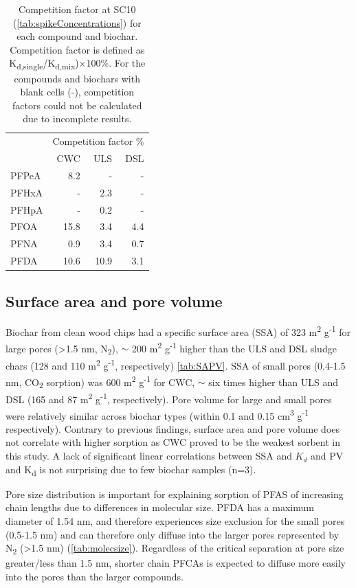 \begin{table}
\centering
\caption{Competition factor at SC10 (\cref{tab:spikeConcentrations}) for each compound and biochar. Competition factor is defined as K\textsubscript{d,single}/K\textsubscript{d,mix})$\times$100\%. For the compounds and biochars with blank cells (-), competition factors could not be calculated due to incomplete results.}
\label{tab:competition}
\begin{tabular}{lrrr}
\toprule
 & \multicolumn{3}{c}{Competition factor \%} \\ \cmidrule(l){2-4}
 & CWC & ULS & DSL \\ \midrule
PFPeA & 8.2 & - & - \\
PFHxA & - & 2.3 & - \\
PFHpA & - & 0.2 & - \\
PFOA & 15.8 & 3.4 & 4.4 \\
PFNA & 0.9 & 3.4 & 0.7 \\
PFDA & 10.6 & 10.9 & 3.1 \\ \bottomrule
\end{tabular}
\end{table}

\subsection{Surface area and pore volume}
Biochar from clean wood chips had a specific surface area (SSA) of 323  m\textsuperscript{2} g\textsuperscript{-1} for large pores (\textgreater 1.5 nm, N\textsubscript{2}), $\sim$ 200 m\textsuperscript{2} g\textsuperscript{-1} higher than the ULS and DSL sludge chars (128 and 110  m\textsuperscript{2} g\textsuperscript{-1}, respectively) \cref{tab:SAPV}. SSA of small pores (0.4-1.5 nm, CO\textsubscript{2} sorption) was 600  m\textsuperscript{2} g\textsuperscript{-1} for CWC, $\sim$ six times higher than ULS and DSL (165 and 87  m\textsuperscript{2} g\textsuperscript{-1}, respectively). Pore volume for large and small pores were relatively similar across biochar types (within 0.1 and 0.15 cm\textsuperscript{3} g\textsuperscript{-1} respectively). Contrary to previous findings, surface area and pore volume does not correlate with higher sorption as CWC proved to be the weakest sorbent in this study. A lack of significant linear correlations between SSA and $K_d$ and PV and K\textsubscript{d} is not surprising due to few biochar samples (n=3). 

Pore size distribution is important for explaining sorption of PFAS of increasing chain lengths due to differences in molecular size. PFDA has a maximum diameter of 1.54 nm, and therefore experiences size exclusion for the small pores (0.5-1.5 nm) and can therefore only diffuse into the larger pores represented by N\textsubscript{2} (\textgreater 1.5 nm) (\cref{tab:molecsize}). Regardless of the critical separation at pore size greater/less than 1.5 nm, shorter chain PFCAs is expected to diffuse more easily into the pores than the larger compounds.  

